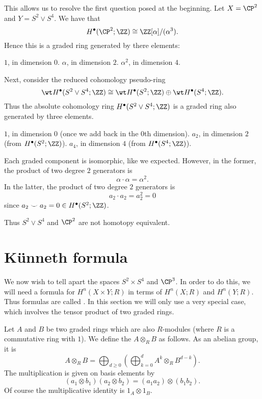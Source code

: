 This allows us to resolve the first question posed at the beginning.
Let $X = \CP^2$ and $Y = S^2 \vee S^4$.
We have that
\[ H^\bullet(\CP^2; \ZZ) \cong \ZZ[\alpha] / (\alpha^3). \]
Hence this is a graded ring generated by there elements:
\begin{itemize}
	\ii $1$, in dimension $0$.
	\ii $\alpha$, in dimension $2$.
	\ii $\alpha^2$, in dimension $4$.
\end{itemize}
Next, consider the reduced cohomology pseudo-ring
\[ \wt H^\bullet(S^2 \vee S^4; \ZZ) \cong
	\wt H^\bullet(S^2; \ZZ)
	\oplus \wt H^\bullet(S^4 ; \ZZ).
\]
Thus the absolute cohomology ring $H^\bullet(S^2 \vee S^4 ; \ZZ)$
is a graded ring also generated by three elements.
\begin{itemize}
	\ii $1$, in dimension $0$ (once we add back in the $0$th dimension).
	\ii $a_2$, in dimension $2$ (from $H^\bullet(S^2 ; \ZZ)$).
	\ii $a_4$, in dimension $4$ (from $H^\bullet(S^4 ; \ZZ)$).
\end{itemize}
Each graded component is isomorphic, like we expected.
However, in the former, the product of two degree $2$ generators is
\[ \alpha \cdot \alpha = \alpha^2. \]
In the latter, the product of two degree $2$ generators is
\[ a_2 \cdot a_2 = a_2^2 = 0 \]
since $a_2 \smile a_2 = 0 \in H^\bullet(S^2; \ZZ)$.

Thus $S^2 \vee S^4$ and $\CP^2$ are not homotopy equivalent.

\section{K\"unneth formula}
We now wish to tell apart the spaces $S^2 \times S^4$ and $\CP^3$.
In order to do this, we will need a formula
for $H^n(X \times Y; R)$ in terms of $H^n(X;R)$ and $H^n(Y;R)$.
Thus formulas are called .
In this section we will only use a very special case,
which involves the tensor product of two graded rings.

\begin{definition}
	Let $A$ and $B$ be two graded rings which are also $R$-modules
	(where $R$ is a commutative ring with $1$).
	We define the  $A \otimes_R B$ as follows.
	As an abelian group, it is
	\[ A \otimes_R B = \bigoplus_{d \ge 0}
		\left( \bigoplus_{k=0}^{d} A^k \otimes_R B^{d-k}  \right). \]
	The multiplication is given on basis elements by
	\[ \left( a_1 \otimes b_1 \right)\left( a_2 \otimes b_2 \right)
		= (a_1a_2) \otimes (b_1b_2).
	\]
	Of course the multiplicative identity is $1_A \otimes 1_B$.
\end{definition}

